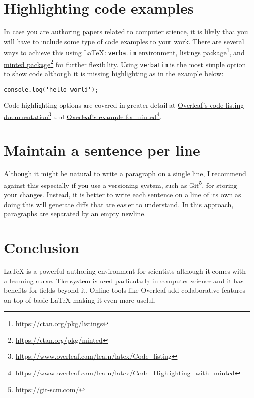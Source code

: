 \section{Highlighting code examples}

In case you are authoring papers related to computer science, it is likely that you will have to include some type of code examples to your work.
There are several ways to achieve this using LaTeX: \texttt{verbatim} environment, \href{https://ctan.org/pkg/listings}{listings package}\footnote{\url{https://ctan.org/pkg/listings}}, and \href{https://ctan.org/pkg/minted}{minted package}\footnote{\url{https://ctan.org/pkg/minted}} for further flexibility.
Using \texttt{verbatim} is the most simple option to show code although it is missing highlighting as in the example below:

\begin{overbatim}
\begin{verbatim}
console.log('hello world');
\end{verbatim}
\end{overbatim}

Code highlighting options are covered in greater detail at \href{https://www.overleaf.com/learn/latex/Code_listing}{Overleaf's code listing documentation}\footnote{\url{https://www.overleaf.com/learn/latex/Code_listing}} and \href{https://www.overleaf.com/learn/latex/Code_Highlighting_with_minted}{Overleaf's example for minted}\footnote{\url{https://www.overleaf.com/learn/latex/Code_Highlighting_with_minted}}.

\section{Maintain a sentence per line}

Although it might be natural to write a paragraph on a single line, I recommend against this especially if you use a versioning system, such as \href{https://git-scm.com/}{Git}\footnote{\url{https://git-scm.com/}}, for storing your changes.
Instead, it is better to write each sentence on a line of its own as doing this will generate diffs that are easier to understand.
In this approach, paragraphs are separated by an empty newline.

\section{Conclusion}

LaTeX is a powerful authoring environment for scientists although it comes with a learning curve.
The system is used particularly in computer science and it has benefits for fields beyond it.
Online tools like Overleaf add collaborative features on top of basic LaTeX making it even more useful.

